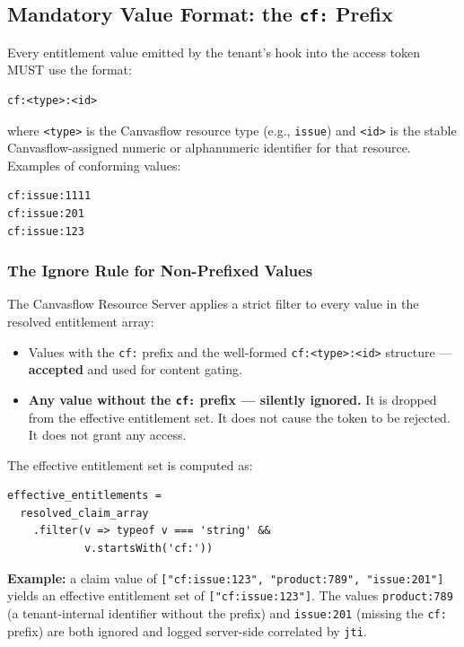 \subsection{Mandatory Value Format: the \texttt{cf:} Prefix}\label{sec:mandatory-value-format}

Every entitlement value emitted by the tenant's hook into the access token MUST use the
format:

\begin{lstlisting}
cf:<type>:<id>
\end{lstlisting}

where \texttt{<type>} is the Canvasflow resource type (e.g., \texttt{issue}) and
\texttt{<id>} is the stable Canvasflow-assigned numeric or alphanumeric identifier for
that resource. Examples of conforming values:

\begin{lstlisting}
cf:issue:1111
cf:issue:201
cf:issue:123
\end{lstlisting}

\subsubsection{The Ignore Rule for Non-Prefixed Values}

The Canvasflow Resource Server applies a strict filter to every value in the resolved
entitlement array:

\begin{itemize}
  \item Values with the \texttt{cf:} prefix and the well-formed
    \texttt{cf:<type>:<id>} structure --- \textbf{accepted} and used for content gating.
  \item \textbf{Any value without the \texttt{cf:} prefix --- silently ignored.} It is
    dropped from the effective entitlement set. It does not cause the token to be
    rejected. It does not grant any access.
\end{itemize}

The effective entitlement set is computed as:

\begin{lstlisting}
effective_entitlements =
  resolved_claim_array
    .filter(v => typeof v === 'string' &&
            v.startsWith('cf:'))
\end{lstlisting}

\textbf{Example:} a claim value of
\texttt{["cf:issue:123",\ "product:789",\ "issue:201"]} yields an effective entitlement
set of \texttt{["cf:issue:123"]}. The values \texttt{product:789} (a tenant-internal
identifier without the prefix) and \texttt{issue:201} (missing the \texttt{cf:} prefix)
are both ignored and logged server-side correlated by \texttt{jti}.

